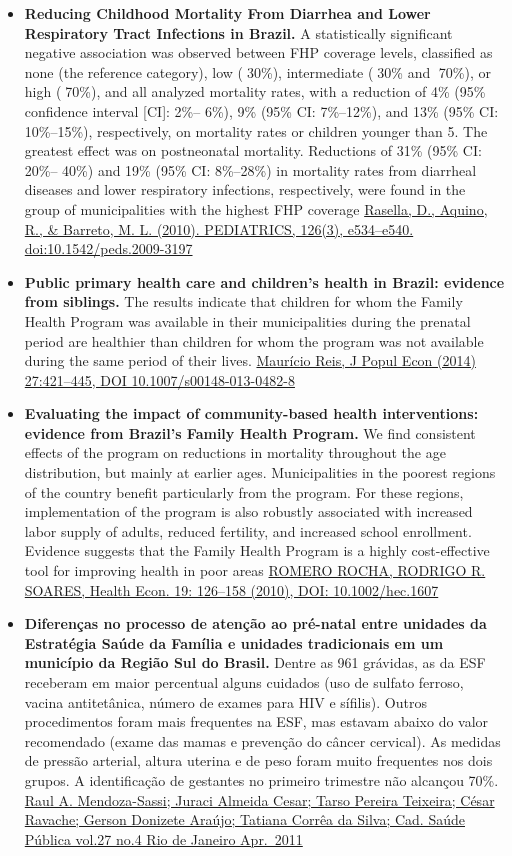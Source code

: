 \documentclass[]{book}
\begin{document}
\begin{itemize}
\item
  \textbf{Reducing Childhood Mortality From Diarrhea and Lower Respiratory Tract Infections in Brazil.} A statistically significant negative association was observed between FHP coverage levels, classified as none (the reference category), low (30\%), intermediate (30\% and 70\%), or high (70\%), and all analyzed mortality rates, with a reduction of 4\% (95\% confidence interval {[}CI{]}: 2\%-- 6\%), 9\% (95\% CI: 7\%--12\%), and 13\% (95\% CI: 10\%--15\%), respectively, on mortality rates or children younger than 5. The greatest effect was on postneonatal mortality. Reductions of 31\% (95\% CI: 20\%-- 40\%) and 19\% (95\% CI: 8\%--28\%) in mortality rates from diarrheal diseases and lower respiratory infections, respectively, were found in the group of municipalities with the highest FHP coverage \href{https://sci-hub.tw/10.1542/peds.2009-3197}{Rasella, D., Aquino, R., \& Barreto, M. L. (2010). PEDIATRICS, 126(3), e534--e540. doi:10.1542/peds.2009-3197}
\item
  \textbf{Public primary health care and children's health in Brazil: evidence from siblings.} The results indicate that children for whom the Family Health Program was available in their municipalities during the prenatal period are healthier than children for whom the program was not available during the same period of their lives. \href{https://sci-hub.tw/10.1007/s00148-013-0482-8}{Maurício Reis, J Popul Econ (2014) 27:421--445, DOI 10.1007/s00148-013-0482-8}
\item
  \textbf{Evaluating the impact of community-based health interventions: evidence from Brazil's Family Health Program.} We find consistent effects of the program on reductions in mortality throughout the age distribution, but mainly at earlier ages. Municipalities in the poorest regions of the country benefit particularly from the program. For these regions, implementation of the program is also robustly associated with increased labor supply of adults, reduced fertility, and increased school enrollment. Evidence suggests that the Family Health Program is a highly cost-effective tool for improving health in poor areas \href{https://sci-hub.tw/10.1002/hec.1607}{ROMERO ROCHA, RODRIGO R. SOARES, Health Econ. 19: 126--158 (2010), DOI: 10.1002/hec.1607}
\item
  \textbf{Diferenças no processo de atenção ao pré-natal entre unidades da Estratégia Saúde da Família e unidades tradicionais em um município da Região Sul do Brasil.} Dentre as 961 grávidas, as da ESF receberam em maior percentual alguns cuidados (uso de sulfato ferroso, vacina antitetânica, número de exames para HIV e sífilis). Outros procedimentos foram mais frequentes na ESF, mas estavam abaixo do valor recomendado (exame das mamas e prevenção do câncer cervical). As medidas de pressão arterial, altura uterina e de peso foram muito frequentes nos dois grupos. A identificação de gestantes no primeiro trimestre não alcançou 70\%. \href{http://www.scielo.br/scielo.php?script=sci_arttext\&pid=S0102-311X2011000400018}{Raul A. Mendoza-Sassi; Juraci Almeida Cesar; Tarso Pereira Teixeira; César Ravache; Gerson Donizete Araújo; Tatiana Corrêa da Silva; Cad. Saúde Pública vol.27 no.4 Rio de Janeiro Apr.~2011}

\end{itemize}
\end{document}
